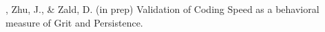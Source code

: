 \item \meb, Zhu, J., \& Zald, D. (in prep) Validation of Coding Speed as a behavioral measure of Grit and Persistence.
\vspace{-2mm}\begin{center}\end{center} \vspace{-4mm}